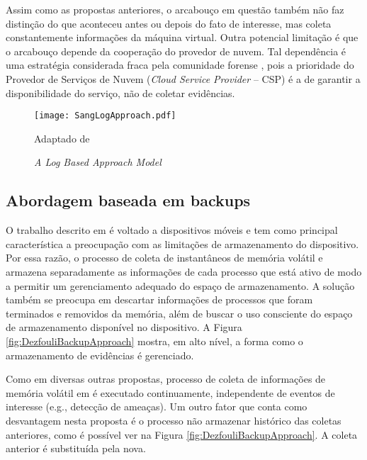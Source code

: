 Assim como as propostas anteriores, o arcabouço em questão também não faz distinção do que aconteceu antes ou depois do fato de interesse, mas  coleta constantemente informações da máquina virtual.
%
Outra potencial limitação é que o arcabouço depende da cooperação do provedor de nuvem. 
%
Tal dependência é uma estratégia considerada fraca pela comunidade forense  \cite{ClarkeReviewOfChallenges2015}, pois a prioridade do Provedor de Serviços de Nuvem (\textit{Cloud Service Provider} -- CSP) é a de garantir a disponibilidade do serviço, não de coletar evidências.
%

\begin{figure}[htb!]
\footnotesize
\caption{\textit{A Log Based Approach Model}}
\texttt{[image: SangLogApproach.pdf]}
\centering
\label{fig:SangLogApproach}
\begin{center}
Adaptado de \cite{SangLogApproach:2013} 
\end{center}
\end{figure}


\subsection{Abordagem baseada em backups}
\label{sec:modelobackup}

O trabalho descrito em \cite{DezfouliBackupApproach:2012} é voltado a dispositivos móveis e tem como principal característica a preocupação com as limitações de armazenamento do dispositivo.
%
Por essa razão, o processo de coleta de instantâneos de memória volátil e armazena separadamente as informações de cada processo que está ativo de modo a permitir um gerenciamento adequado do espaço de armazenamento. 
%
A solução também se preocupa em descartar informações de processos que foram terminados e removidos da memória, além de buscar o uso consciente do espaço de armazenamento disponível no dispositivo.
%
A Figura \ref{fig:DezfouliBackupApproach} mostra, em alto nível, a forma como o armazenamento de evidências é gerenciado.

Como em diversas outras propostas, processo de coleta de informações de memória volátil em \cite{DezfouliBackupApproach:2012} é executado continuamente, independente de eventos de interesse (e.g., detecção de ameaças). 
%
Um outro fator que conta como desvantagem nesta proposta é o processo não armazenar histórico das coletas anteriores, como é possível ver na Figura \ref{fig:DezfouliBackupApproach}. A coleta anterior é substituída pela nova.
%


